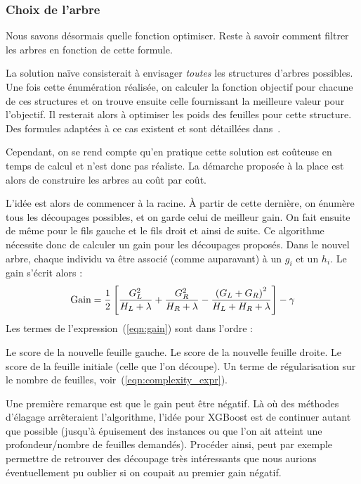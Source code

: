 \subsubsection{Choix de l'arbre}
Nous savons désormais quelle fonction optimiser. Reste à savoir comment filtrer les arbres en fonction de cette formule.

La solution naïve consisterait à envisager \textit{toutes} les structures d'arbres possibles. Une fois cette énumération réalisée, on calculer la fonction objectif pour chacune de ces structures et on trouve ensuite celle fournissant la meilleure valeur pour l'objectif. Il resterait alors à optimiser les poids des feuilles pour cette structure. Des formules adaptées à ce cas existent et sont détaillées dans~\cite{bib:xgboost-article}.

Cependant, on se rend compte qu'en pratique cette solution est coûteuse en temps de calcul et n'est donc pas réaliste. La démarche proposée à la place est alors de construire les arbres au coût par coût.

L'idée est alors de commencer à la racine. À partir de cette dernière, on énumère tous les découpages possibles, et on garde celui de meilleur gain. On fait ensuite de même pour le fils gauche et le fils droit et ainsi de suite. Ce algorithme nécessite donc de calculer un gain pour les découpages proposés. Dans le nouvel arbre, chaque individu va être associé (comme auparavant) à un $g_i$ et un $h_i$. Le gain s'écrit alors :
\begin{equation}
\textnormal{Gain}=\frac{1}{2}\left[\frac{G_L^2}{H_L+\lambda}+\frac{G_R^2}{H_R+\lambda}-\frac{\left(G_L+G_R\right)^2}{H_L+H_R+\lambda}\right]-\gamma
\label{eqn:gain}
\end{equation}
Les termes de l'expression~(\ref{eqn:gain}) sont dans l'ordre :\begin{itemize}
	\itemperso{}Le score de la nouvelle feuille gauche.
	\itemperso{}Le score de la nouvelle feuille droite.
	\itemperso{}Le score de la feuille initiale (celle que l'on découpe).
	\itemperso{}Un terme de régularisation sur le nombre de feuilles, voir~(\ref{eqn:complexity_expr}).
\end{itemize}
Une première remarque est que le gain peut être négatif. Là où des méthodes d'élagage arrêteraient l'algorithme, l'idée pour XGBoost est de continuer autant que possible (jusqu'à épuisement des instances ou que l'on ait atteint une profondeur/nombre de feuilles demandés). Procéder ainsi, peut par exemple permettre de retrouver des découpage très intéressants que nous aurions éventuellement pu oublier si on coupait au premier gain négatif.

